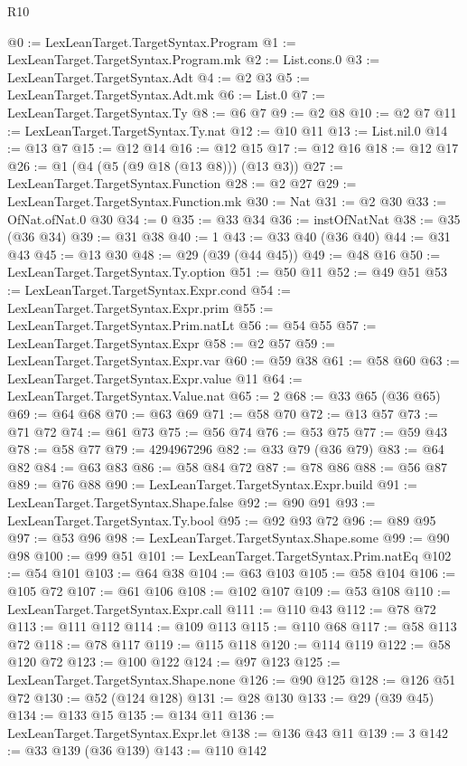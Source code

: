 \begin{lexlean}{R10}
\begin{coremodule}
@0 := LexLeanTarget.TargetSyntax.Program
@1 := LexLeanTarget.TargetSyntax.Program.mk
@2 := List.cons.{0}
@3 := LexLeanTarget.TargetSyntax.Adt
@4 := @2 @3
@5 := LexLeanTarget.TargetSyntax.Adt.mk
@6 := List.{0}
@7 := LexLeanTarget.TargetSyntax.Ty
@8 := @6 @7
@9 := @2 @8
@10 := @2 @7
@11 := LexLeanTarget.TargetSyntax.Ty.nat
@12 := @10 @11
@13 := List.nil.{0}
@14 := @13 @7
@15 := @12 @14
@16 := @12 @15
@17 := @12 @16
@18 := @12 @17
@26 := @1 (@4 (@5 (@9 @18 (@13 @8))) (@13 @3))
@27 := LexLeanTarget.TargetSyntax.Function
@28 := @2 @27
@29 := LexLeanTarget.TargetSyntax.Function.mk
@30 := Nat
@31 := @2 @30
@33 := OfNat.ofNat.{0} @30
@34 := 0
@35 := @33 @34
@36 := instOfNatNat
@38 := @35 (@36 @34)
@39 := @31 @38
@40 := 1
@43 := @33 @40 (@36 @40)
@44 := @31 @43
@45 := @13 @30
@48 := @29 (@39 (@44 @45))
@49 := @48 @16
@50 := LexLeanTarget.TargetSyntax.Ty.option
@51 := @50 @11
@52 := @49 @51
@53 := LexLeanTarget.TargetSyntax.Expr.cond
@54 := LexLeanTarget.TargetSyntax.Expr.prim
@55 := LexLeanTarget.TargetSyntax.Prim.natLt
@56 := @54 @55
@57 := LexLeanTarget.TargetSyntax.Expr
@58 := @2 @57
@59 := LexLeanTarget.TargetSyntax.Expr.var
@60 := @59 @38
@61 := @58 @60
@63 := LexLeanTarget.TargetSyntax.Expr.value @11
@64 := LexLeanTarget.TargetSyntax.Value.nat
@65 := 2
@68 := @33 @65 (@36 @65)
@69 := @64 @68
@70 := @63 @69
@71 := @58 @70
@72 := @13 @57
@73 := @71 @72
@74 := @61 @73
@75 := @56 @74
@76 := @53 @75
@77 := @59 @43
@78 := @58 @77
@79 := 4294967296
@82 := @33 @79 (@36 @79)
@83 := @64 @82
@84 := @63 @83
@86 := @58 @84 @72
@87 := @78 @86
@88 := @56 @87
@89 := @76 @88
@90 := LexLeanTarget.TargetSyntax.Expr.build
@91 := LexLeanTarget.TargetSyntax.Shape.false
@92 := @90 @91
@93 := LexLeanTarget.TargetSyntax.Ty.bool
@95 := @92 @93 @72
@96 := @89 @95
@97 := @53 @96
@98 := LexLeanTarget.TargetSyntax.Shape.some
@99 := @90 @98
@100 := @99 @51
@101 := LexLeanTarget.TargetSyntax.Prim.natEq
@102 := @54 @101
@103 := @64 @38
@104 := @63 @103
@105 := @58 @104
@106 := @105 @72
@107 := @61 @106
@108 := @102 @107
@109 := @53 @108
@110 := LexLeanTarget.TargetSyntax.Expr.call
@111 := @110 @43
@112 := @78 @72
@113 := @111 @112
@114 := @109 @113
@115 := @110 @68
@117 := @58 @113 @72
@118 := @78 @117
@119 := @115 @118
@120 := @114 @119
@122 := @58 @120 @72
@123 := @100 @122
@124 := @97 @123
@125 := LexLeanTarget.TargetSyntax.Shape.none
@126 := @90 @125
@128 := @126 @51 @72
@130 := @52 (@124 @128)
@131 := @28 @130
@133 := @29 (@39 @45)
@134 := @133 @15
@135 := @134 @11
@136 := LexLeanTarget.TargetSyntax.Expr.let
@138 := @136 @43 @11
@139 := 3
@142 := @33 @139 (@36 @139)
@143 := @110 @142

\end{coremodule}
\end{lexlean}
